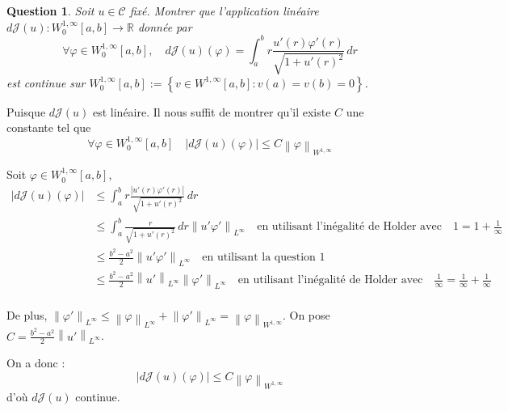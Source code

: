 \documentclass{article}
\newcommand{\Real}{ \mathbb{R} }
\newcommand{\Set}[1]{ \left\{ #1 \right\} }
\newcommand{\Abs}[1]{ \left| #1 \right| }
\newcommand{\FunctionWithSqrt}[1]{ \sqrt{1 + #1 ^2} }
\newcommand{\Norm}[2]{ \left\| #1 \right\|_{#2} }
\newcommand{\Integral}[4]{ \int_{#1}^{#2} #3 \, d#4 }
\newtheorem{question}{Question}[subsection]
\newenvironment{answer}
  {\color{blue}}
  {}
\newcommand{\QuestionAnswer}[2]{
    \begin{question}
        #1
    \end{question}
    \begin{answer}
        #2
    \end{answer}
}
\newcommand{\SetC}{\mathcal{C}}
\newcommand{\FunctionJ}{\mathcal{J}}
\begin{document}
\QuestionAnswer{
    Soit $u \in \SetC$ fixé. Montrer que l'application linéaire $d\FunctionJ(u) : W^{1,\infty}_0[a, b] \to \Real$ donnée par
    $$\forall \varphi \in W^{1,\infty}_0[a, b], \quad d\FunctionJ(u)(\varphi) = \Integral{a}{b}{ r \frac{u'(r)\varphi'(r)}{\FunctionWithSqrt{u'(r)}} }{r}$$
    est continue sur $W^{1,\infty}_0[a, b] := \Set{ v \in W^{1,\infty}[a, b] : v(a) = v(b) = 0 }$.
}{
    Puisque $d\FunctionJ(u)$ est linéaire. Il nous suffit de montrer qu'il existe $C$ une constante tel que 
    $$\forall \varphi \in W^{1,\infty}_0[a, b] \quad 
    \Abs{d\FunctionJ(u)(\varphi)} \leq C \Norm{\varphi}{W^{1,\infty}}$$

    Soit $\varphi \in W^{1,\infty}_0[a, b]$, 
    \begin{align*}
        \Abs{d\FunctionJ(u)(\varphi)} &\leq \Integral{a}{b}{ r \frac{\Abs{u'(r)\varphi'(r)}}{\FunctionWithSqrt{u'(r)}} }{r} \\
        &\leq \Integral{a}{b}{ \frac{r}{\FunctionWithSqrt{u'(r)}} }{r} \Norm{u' \varphi'}{L^\infty} \quad \text{en utilisant l'inégalité de Holder avec} \quad 1 = 1 + \frac{1}{\infty} \\
        &\leq \frac{b^2-a^2}{2} \Norm{u'\varphi'}{L^\infty} \quad \text{en utilisant la question 1} \\
        &\leq \frac{b^2-a^2}{2} \Norm{u'}{L^\infty} \Norm{\varphi'}{L^\infty} \quad \text{en utilisant l'inégalité de Holder avec} \quad \frac{1}{\infty} = \frac{1}{\infty} + \frac{1}{\infty} \\
    \end{align*}

     De plus, $\Norm{\varphi'}{L^\infty} \leq \Norm{\varphi}{L^\infty} + \Norm{\varphi'}{L^\infty} = \Norm{\varphi}{W^{1,\infty}}$. On pose $C = \frac{b^2-a^2}{2} \Norm{u'}{L^\infty}$.

     On a donc :
     $$\Abs{d\FunctionJ(u)(\varphi)} \leq C \Norm{\varphi}{W^{1,\infty}}$$
     d'où $d\FunctionJ(u)$ continue.
}
\end{document}
